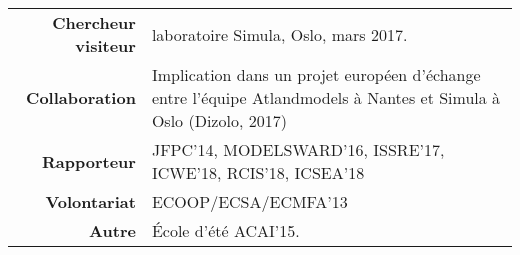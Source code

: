 \documentclass{article} %
\begin{document}





\begin{tabular}{r @{~$\rangle$~} p{}}

{\bf Chercheur visiteur} & laboratoire Simula, Oslo, mars 2017. \\

{\bf Collaboration} & Implication dans un projet européen d'échange entre l'équipe Atlandmodels à Nantes et Simula à Oslo (Dizolo, 2017) \\

{\bf Rapporteur} & JFPC'14, MODELSWARD'16, ISSRE'17, ICWE'18, RCIS'18, ICSEA'18 \\

{\bf Volontariat} & ECOOP/ECSA/ECMFA'13 \\

{\bf Autre} & École d'été ACAI'15. \\

\end{tabular}








\end{document}
